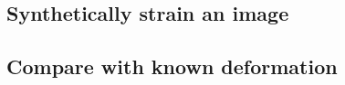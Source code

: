 \subsection{Synthetically strain an image}
\label{sec:code_synthetic_strain}


\subsection{Compare with known deformation}
\label{sec:dvc_synthetic_compare}
